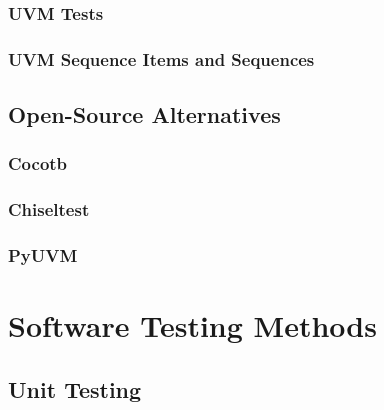 \documentclass[12pt]{report}
\begin{document}

\subsubsection{UVM Tests} %

\subsubsection{UVM Sequence Items and Sequences} %

\subsection{Open-Source Alternatives} %

\subsubsection{Cocotb} %

\subsubsection{Chiseltest} %

\subsubsection{PyUVM} %

\section{Software Testing Methods} %

\subsection{Unit Testing} %
\end{document}
